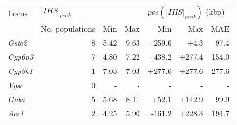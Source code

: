 \begin{tabular}{lrrrrrr}
\toprule
           Locus & \multicolumn{3}{l}{$|IHS|_{peak}$} & \multicolumn{3}{l}{$pos(|IHS|_{peak})$ (kbp)} \\
                 & No. populations &  Min &  Max &                       Min &    Max &   MAE \\
\midrule
  \textit{Gste2} &               8 & 5.42 & 9.63 &                    -259.6 &   +4.3 &  97.4 \\
 \textit{Cyp6p3} &               7 & 4.80 & 7.22 &                    -438.2 & +277.4 & 154.0 \\
 \textit{Cyp9k1} &               1 & 7.03 & 7.03 &                    +277.6 & +277.6 & 277.6 \\
   \textit{Vgsc} &               0 &    - &    - &                         - &      - &     - \\
   \textit{Gaba} &               5 & 5.68 & 8.11 &                     +52.1 & +142.9 &  99.9 \\
   \textit{Ace1} &               2 & 4.25 & 5.90 &                    -161.2 & +228.3 & 194.7 \\
\bottomrule
\end{tabular}
